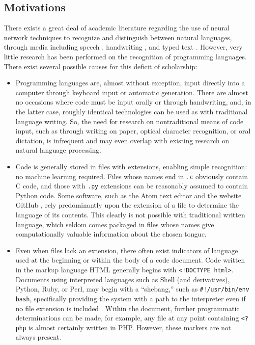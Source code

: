 \documentclass{article}
\begin{document}
\subsection{Motivations}
There exists a great deal of academic literature regarding the use of neural network techniques to recognize and distinguish between natural languages, through media including speech \cite{rnnspoken}\cite{dcrnnspoken}, handwriting \cite{handwritingex}, and typed text \cite{langidnn}\cite{langidstanford}. However, very little research has been performed on the recognition of programming languages. There exist several possible causes for this deficit of scholarship:
\begin{itemize}
    \item{Programming languages are, almost without exception, input directly into a computer through keyboard input or automatic generation. There are almost no occasions where code must be input orally or through handwriting, and, in the latter case, roughly identical technologies can be used as with traditional language writing. So, the need for research on nontraditional means of code input, such as through writing on paper, optical character recognition, or oral dictation, is infrequent and may even overlap with existing research on natural language processing.}
    \item{Code is generally stored in files with extensions, enabling simple recognition: no machine learning required. Files whose names end in \texttt{.c} obviously contain C code, and those with \texttt{.py} extensions can be reasonably assumed to contain Python code. Some software, such as the Atom text editor and the website GitHub \cite{githubid}, rely predominantly upon the extension of a file to determine the language of its contents. This clearly is not possible with traditional written language, which seldom comes packaged in files whose names give computationally valuable information about the chosen tongue.}
    \item{Even when files lack an extension, there often exist indicators of language used at the beginning or within the body of a code document. Code written in the markup language HTML generally begins with \texttt{<!DOCTYPE html>}. Documents using interpreted languages such as Shell (and derivatives), Python, Ruby, or Perl, may begin with a ``shebang,'' such as \texttt{#!/usr/bin/env bash}, specifically providing the system with a path to the interpreter even if no file extension is included \cite{shebang}. Within the document, further programmatic determinations can be made, for example, any file at any point containing \texttt{<?php} is almost certainly written in PHP. However, these markers are not always present.}
\end{itemize}
\end{document}
